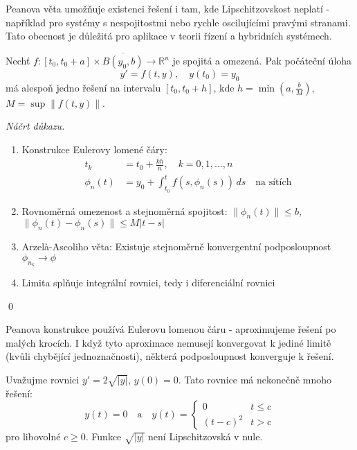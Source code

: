 \begin{motivation}
Peanova věta umožňuje existenci řešení i tam, kde Lipschitzovskost neplatí - například pro systémy s nespojitostmi nebo rychle oscilujícími pravými stranami. Tato obecnost je důležitá pro aplikace v teorii řízení a hybridních systémech.
\end{motivation}

\begin{theorem}
Nechť $f: [t_0, t_0+a] \times \overline{B(y_0,b)} \to \mathbb{R}^n$ je spojitá a omezená. Pak počáteční úloha
\[
y' = f(t,y), \quad y(t_0) = y_0
\]
má alespoň jedno řešení na intervalu $[t_0, t_0+h]$, kde $h = \min\left(a, \frac{b}{M}\right)$, $M = \sup\|f(t,y)\|$.
\end{theorem}

\begin{proof}[Náčrt důkazu]
\begin{enumerate}
\item Konstrukce Eulerovy lomené čáry:
\begin{align*}
t_k &= t_0 + \frac{kh}{n}, \quad k = 0,1,\dots,n \\
\phi_n(t) &= y_0 + \int_{t_0}^t f(s, \phi_n(s))\, ds \quad \text{na sítích}
\end{align*}
\item Rovnoměrná omezenost a stejnoměrná spojitost: $\|\phi_n(t)\| \leq b$, $\|\phi_n(t) - \phi_n(s)\| \leq M|t-s|$
\item Arzelà-Ascoliho věta: Existuje stejnoměrně konvergentní podposloupnost $\phi_{n_k} \to \phi$
\item Limita splňuje integrální rovnici, tedy i diferenciální rovnici
\end{enumerate}
\qed
\end{proof}

\begin{intuition}
Peanova konstrukce používá Eulerovu lomenou čáru - aproximujeme řešení po malých krocích. I když tyto aproximace nemusejí konvergovat k jediné limitě (kvůli chybějící jednoznačnosti), některá podposloupnost konverguje k řešení.
\end{intuition}

\begin{example}
Uvažujme rovnici $y' = 2\sqrt{|y|}$, $y(0) = 0$. Tato rovnice má nekonečně mnoho řešení:
\[
y(t) = 0 \quad \text{a} \quad y(t) = \begin{cases}
0 & t \leq c \\
(t-c)^2 & t > c
\end{cases}
\]
pro libovolné $c \geq 0$. Funkce $\sqrt{|y|}$ není Lipschitzovská v nule.
\end{example}

